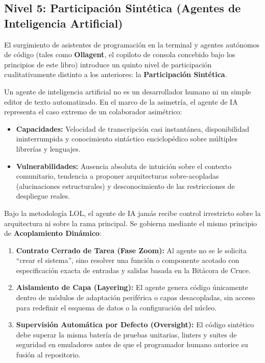 \documentclass[14pt,a4paper,oneside]{extbook}
\begin{document}
\subsection{Nivel 5: Participación Sintética (Agentes de Inteligencia Artificial)}

El surgimiento de asistentes de programación en la terminal y agentes autónomos de código (tales como \textbf{Ollagent}, el copiloto de consola concebido bajo los principios de este libro) introduce un quinto nivel de participación cualitativamente distinto a los anteriores: la \textbf{Participación Sintética}.

Un agente de inteligencia artificial no es un desarrollador humano ni un simple editor de texto automatizado. En el marco de la asimetría, el agente de IA representa el caso extremo de un colaborador asimétrico:
\begin{itemize}
    \item \textbf{Capacidades:} Velocidad de transcripción casi instantánea, disponibilidad ininterrumpida y conocimiento sintáctico enciclopédico sobre múltiples librerías y lenguajes.
    \item \textbf{Vulnerabilidades:} Ausencia absoluta de intuición sobre el contexto comunitario, tendencia a proponer arquitecturas sobre-acopladas (alucinaciones estructurales) y desconocimiento de las restricciones de despliegue reales.
\end{itemize}

Bajo la metodología LOL, el agente de IA jamás recibe control irrestricto sobre la arquitectura ni sobre la rama principal. Se gobierna mediante el mismo principio de \textbf{Acoplamiento Dinámico}:
\begin{enumerate}
    \item \textbf{Contrato Cerrado de Tarea (Fase Zoom):} Al agente no se le solicita \enquote{crear el sistema}, sino resolver una función o componente acotado con especificación exacta de entradas y salidas basada en la Bitácora de Cruce.
    \item \textbf{Aislamiento de Capa (Layering):} El agente genera código únicamente dentro de módulos de adaptación periférica o capas desacopladas, sin acceso para redefinir el esquema de datos o la configuración del núcleo.
    \item \textbf{Supervisión Automática por Defecto (Oversight):} El código sintético debe superar la misma batería de pruebas unitarias, linters y suites de seguridad en emuladores antes de que el programador humano autorice su fusión al repositorio.
\end{enumerate}
\end{document}
